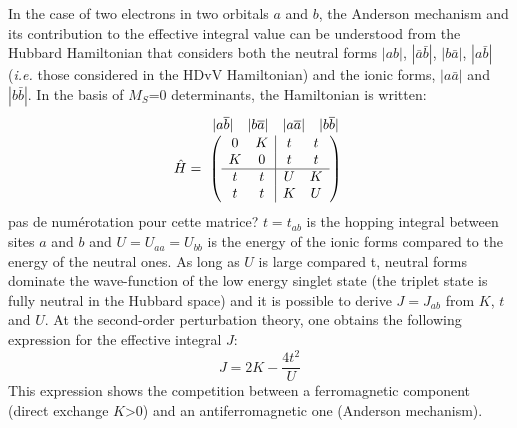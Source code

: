 \documentclass[12pt,a4paper]{report}
\numberwithin{equation}{section}
\begin{document}
 In the case of two electrons in two orbitals $a$ and $b$, the Anderson mechanism and its contribution to the effective integral value can be understood from the Hubbard Hamiltonian that considers both the neutral forms $|ab|$, $|\bar{a}\bar{b}|$, $|b\bar{a}|$, $|a\bar{b}|$ (\textit{i.e.} those considered in the HDvV Hamiltonian) and the ionic forms, $|a\bar{a}|$ and  $|b\bar{b}|$\cite{malrieu_magnetic_2014}.
 In the basis of $M_S$=0 determinants, the Hamiltonian is written:
\[ \hat{H}=
\overset{
    \begin{array}{c c c c}
      |a\overline{b}| & |b\overline{a}| & |a\overline{a}| & |b\overline{b}|\\ 
    \end{array}
  }{
    \left(
  \begin{array}{ c c | c c }
  0  &  K &  t &  t\\
  K & 0 & t & t \\
  \hline
  t & t & U & K \\
  t & t & K & U 
  \end{array}
  \right)
  }
\]
pas de numérotation pour cette matrice?
 $t=t_{ab}$ is the hopping integral between sites $a$ and $b$ and $U=U_{aa}=U_{bb}$ is the energy of the ionic forms compared to the energy of the neutral ones.
 As long as $U$ is large compared t, neutral forms dominate the wave-function of the low energy singlet state (the triplet state is fully neutral in the Hubbard space) and it is possible to derive $J=J_{ab}$ from $K$, $t$ and $U$.
 At the second-order perturbation theory, one obtains the following expression for the effective integral $J$:
\begin{equation}
    J=2K-\frac{4t^2}{U}
    \label{eq:JHubb}
\end{equation}
This expression shows the competition between a ferromagnetic component (direct exchange $K$>0) and an antiferromagnetic one (Anderson mechanism).
\end{document}
